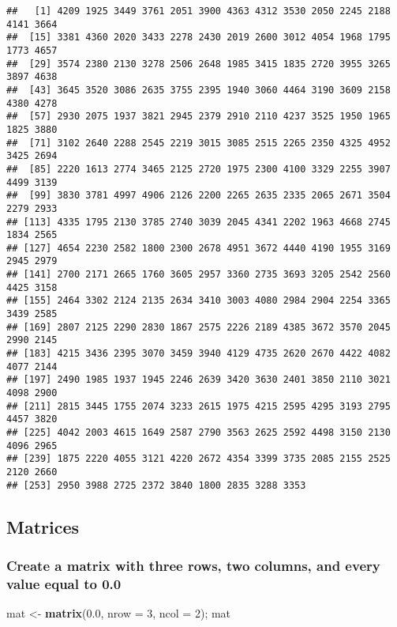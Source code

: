\documentclass[11pt,]{article}
\newenvironment{Shaded}{\begin{snugshade}}{\end{snugshade}}
\newcommand{\DataTypeTok}[1]{\textcolor[rgb]{0.13,0.29,0.53}{#1}}
\newcommand{\DecValTok}[1]{\textcolor[rgb]{0.00,0.00,0.81}{#1}}
\newcommand{\FloatTok}[1]{\textcolor[rgb]{0.00,0.00,0.81}{#1}}
\newcommand{\KeywordTok}[1]{\textcolor[rgb]{0.13,0.29,0.53}{\textbf{#1}}}
\newcommand{\NormalTok}[1]{#1}
\newcommand{\StringTok}[1]{\textcolor[rgb]{0.31,0.60,0.02}{#1}}
\begin{document}
\begin{verbatim}
##   [1] 4209 1925 3449 3761 2051 3900 4363 4312 3530 2050 2245 2188 4141 3664
##  [15] 3381 4360 2020 3433 2278 2430 2019 2600 3012 4054 1968 1795 1773 4657
##  [29] 3574 2380 2130 3278 2506 2648 1985 3415 1835 2720 3955 3265 3897 4638
##  [43] 3645 3520 3086 2635 3755 2395 1940 3060 4464 3190 3609 2158 4380 4278
##  [57] 2930 2075 1937 3821 2945 2379 2910 2110 4237 3525 1950 1965 1825 3880
##  [71] 3102 2640 2288 2545 2219 3015 3085 2515 2265 2350 4325 4952 3425 2694
##  [85] 2220 1613 2774 3465 2125 2720 1975 2300 4100 3329 2255 3907 4499 3139
##  [99] 3830 3781 4997 4906 2126 2200 2265 2635 2335 2065 2671 3504 2279 2933
## [113] 4335 1795 2130 3785 2740 3039 2045 4341 2202 1963 4668 2745 1834 2565
## [127] 4654 2230 2582 1800 2300 2678 4951 3672 4440 4190 1955 3169 2945 2979
## [141] 2700 2171 2665 1760 3605 2957 3360 2735 3693 3205 2542 2560 4425 3158
## [155] 2464 3302 2124 2135 2634 3410 3003 4080 2984 2904 2254 3365 3439 2585
## [169] 2807 2125 2290 2830 1867 2575 2226 2189 4385 3672 3570 2045 2990 2145
## [183] 4215 3436 2395 3070 3459 3940 4129 4735 2620 2670 4422 4082 4077 2144
## [197] 2490 1985 1937 1945 2246 2639 3420 3630 2401 3850 2110 3021 4098 2900
## [211] 2815 3445 1755 2074 3233 2615 1975 4215 2595 4295 3193 2795 4457 3820
## [225] 4042 2003 4615 1649 2587 2790 3563 2625 2592 4498 3150 2130 4096 2965
## [239] 1875 2220 4055 3121 4220 2672 4354 3399 3735 2085 2155 2525 2120 2660
## [253] 2950 3988 2725 2372 3840 1800 2835 3288 3353
\end{verbatim}

\hypertarget{matrices}{%
\subsection{Matrices}\label{matrices}}

\hypertarget{create-a-matrix-with-three-rows-two-columns-and-every-value-equal-to-0.0}{%
\subsubsection{Create a matrix with three rows, two columns, and every
value equal to
0.0}\label{create-a-matrix-with-three-rows-two-columns-and-every-value-equal-to-0.0}}

\begin{Shaded}
\begin{Highlighting}[]
\NormalTok{  mat <-}\StringTok{ }\KeywordTok{matrix}\NormalTok{(}\FloatTok{0.0}\NormalTok{, }\DataTypeTok{nrow =} \DecValTok{3}\NormalTok{, }\DataTypeTok{ncol =} \DecValTok{2}\NormalTok{); mat}
\end{Highlighting}
\end{Shaded}
\end{document}
